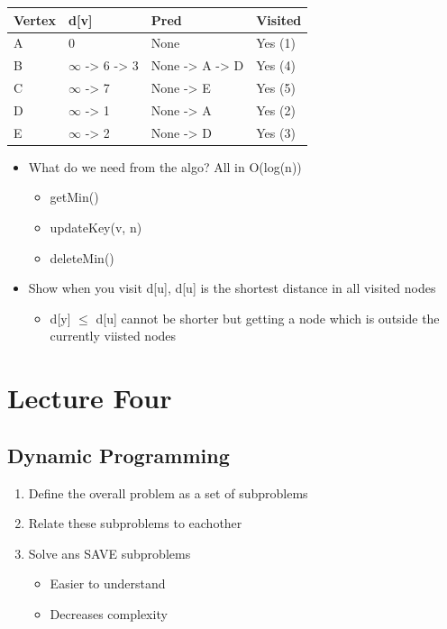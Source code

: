 \documentclass[11pt]{article}
\begin{document}
\begin{center}
\begin{tabular}{llll}
Vertex & d[v] & Pred & Visited\\
\hline
A & 0 & None & Yes (1)\\
B & \(\infty\) -> 6 -> 3 & None -> A -> D & Yes (4)\\
C & \(\infty\) -> 7 & None -> E & Yes (5)\\
D & \(\infty\) -> 1 & None -> A & Yes (2)\\
E & \(\infty\) -> 2 & None -> D & Yes (3)\\
\end{tabular}
\end{center}
\begin{itemize}
\item What do we need from the algo? All in O(log(n))
\begin{itemize}
\item getMin()
\item updateKey(v, n)
\item deleteMin()
\end{itemize}
\item Show when you visit d[u], d[u] is the shortest distance in all visited nodes
\begin{itemize}
\item d[y] \(\le\) d[u] cannot be shorter but getting a node which is outside the currently viisted nodes
\end{itemize}
\end{itemize}
\section*{Lecture Four}
\label{sec:org6e20005}
\subsection*{Dynamic Programming}
\label{sec:orgd3f1ef1}
\begin{enumerate}
\item Define the overall problem as a set of subproblems
\item Relate these subproblems to eachother
\item Solve ans SAVE subproblems
\begin{itemize}
\item Easier to understand
\item Decreases complexity
\end{itemize}
\end{enumerate}
\end{document}
